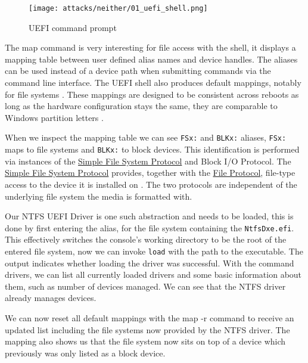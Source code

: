 \begin{figure}[htb]
    \centering
    \texttt{[image: attacks/neither/01\_uefi\_shell.png]}
    \caption{\ac{UEFI} command prompt}
    \label{fig:uefi-shell}
\end{figure}


The map command is very interesting for file access with the shell, it displays a mapping table between user defined alias names and device handles.
The aliases can be used instead of a device path when submitting commands via the command line interface.
The \ac{UEFI} shell also produces default mappings, notably for file systems \cite[3.7.2. Mappings]{uefi-shell-spec}.
These mappings are designed to be consistent across reboots as long as the hardware configuration stays the same, they are comparable to Windows partition letters \cite[Appendix A]{uefi-shell-spec}.

When we inspect the mapping table we can see \lstinline{FSx:} and \lstinline{BLKx:} aliases, \lstinline{FSx:} maps to file systems and \lstinline{BLKx:} to block devices.
This identification is performed via instances of the \hyperref[lst:simple-filesystem-protocol]{Simple File System Protocol} and  Block \ac{I/O} Protocol.
The \hyperref[lst:simple-filesystem-protocol]{Simple File System Protocol} \cite[13.4]{uefi-spec} provides, together with the \hyperref[lst:file-protocol]{File Protocol}, file-type access to the device it is installed on \cite[13.5]{uefi-spec}.
The two protocols are independent of the underlying file system the media is formatted with.


Our \ac{NTFS} \ac{UEFI} Driver is one such abstraction and needs to be loaded, this is done by first entering the alias, for the file system containing the \lstinline{NtfsDxe.efi}.
This effectively switches the console's working directory to be the root of the entered file system, now we can invoke \lstinline{load} with the path to the executable.
The output indicates whether loading the driver was successful.
With the command drivers, we can list all currently loaded drivers and some basic information about them, such as number of devices managed.
We can see that the NTFS driver already manages devices.

We can now reset all default mappings with the map -r command to receive an updated list including the file systems now provided by the \ac{NTFS} driver.
The mapping also shows us that the file system now sits on top of a device which previously was only listed as a block device.

